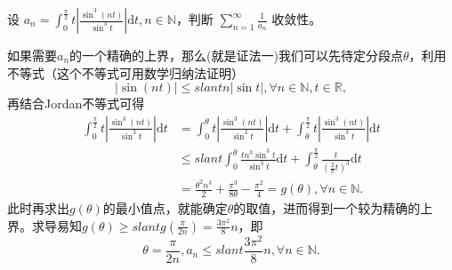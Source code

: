 \documentclass[../../main.tex]{subfiles}
\begin{document}
\begin{example}
设 \( a_n = \int_{0}^{\frac{\pi}{2}} t \left| \frac{\sin^3 (nt)}{\sin^3 t} \right| \mathrm{d}t, n \in \mathbb{N} \)，判断 \( \sum_{n = 1}^{\infty} \frac{1}{a_n} \) 收敛性。
\end{example}
\begin{note}
如果需要$a_n$的一个精确的上界，那么(就是证法一)我们可以先待定分段点$\theta$，利用不等式（这个不等式可用数学归纳法证明）
\[
|\sin(nt)| \leqslant slant n|\sin t|, \forall n \in \mathbb{N}, t \in \mathbb{R},
\]
再结合Jordan不等式可得
\begin{align*}
\int_0^{\frac{\pi}{2}} t \left| \frac{\sin^3(nt)}{\sin^3 t} \right| \mathrm{d}t &= \int_0^{\theta} t \left| \frac{\sin^3(nt)}{\sin^3 t} \right| \mathrm{d}t + \int_{\theta}^{\frac{\pi}{2}} t \left| \frac{\sin^3(nt)}{\sin^3 t} \right| \mathrm{d}t \\
&\leqslant slant \int_0^{\theta} \frac{t n^3 \sin^3 t}{\sin^3 t} \mathrm{d}t + \int_{\theta}^{\frac{\pi}{2}} \frac{t}{\left( \frac{2}{\pi} t \right)^3} \mathrm{d}t \\
&= \frac{\theta^2 n^3}{2} + \frac{\pi^3}{8 \theta} - \frac{\pi^2}{4} = g(\theta), \forall n \in \mathbb{N}.
\end{align*}
此时再求出$g(\theta)$的最小值点，就能确定$\theta$的取值，进而得到一个较为精确的上界。求导易知$g(\theta) \geqslant slant g\left( \frac{\pi}{2n} \right) = \frac{3\pi^2}{8} n$，即
\[
\theta = \frac{\pi}{2n}, a_n \leqslant slant \frac{3\pi^2}{8} n, \forall n \in \mathbb{N}.
\]
\end{note}
\end{document}
